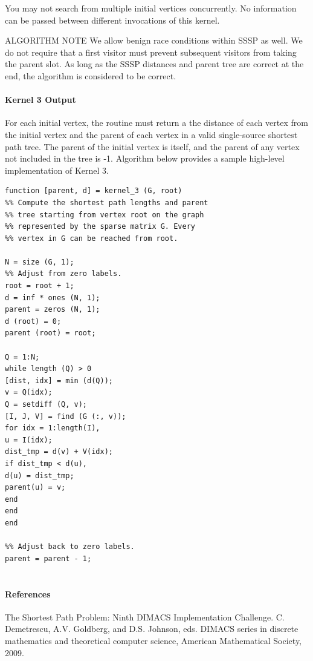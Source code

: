 \documentclass{article}
\begin{document}
You may not search from multiple initial vertices concurrently. No information can be passed between different invocations of this kernel.

ALGORITHM NOTE We allow benign race conditions within SSSP as well. We do not require that a first visitor must prevent subsequent visitors from taking the parent slot. As long as the SSSP distances and parent tree are correct at the end, the algorithm is considered to be correct.

\paragraph*{Kernel 3 Output}

For each initial vertex, the routine must return a the distance of each vertex from the initial vertex and the parent of each vertex in a valid single-source shortest path tree. The parent of the initial vertex is itself, and the parent of any vertex not included in the tree is -1. Algorithm below provides a sample high-level implementation of Kernel 3.

\begin{lstlisting}
function [parent, d] = kernel_3 (G, root)
%% Compute the shortest path lengths and parent
%% tree starting from vertex root on the graph
%% represented by the sparse matrix G. Every
%% vertex in G can be reached from root.

N = size (G, 1);
%% Adjust from zero labels.
root = root + 1;
d = inf * ones (N, 1);
parent = zeros (N, 1);
d (root) = 0;
parent (root) = root;

Q = 1:N;
while length (Q) > 0
[dist, idx] = min (d(Q));
v = Q(idx);
Q = setdiff (Q, v);
[I, J, V] = find (G (:, v));
for idx = 1:length(I),
u = I(idx);
dist_tmp = d(v) + V(idx);
if dist_tmp < d(u),
d(u) = dist_tmp;
parent(u) = v;
end
end
end

%% Adjust back to zero labels.
parent = parent - 1;


\end{lstlisting}

\paragraph*{References}

The Shortest Path Problem: Ninth DIMACS Implementation Challenge. C. Demetrescu, A.V. Goldberg, and D.S. Johnson, eds. DIMACS series in discrete mathematics and theoretical computer science, American Mathematical Society, 2009.
\end{document}
